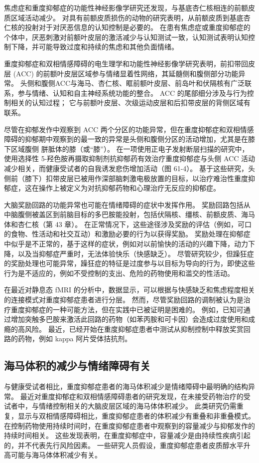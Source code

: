 焦虑症和重度抑郁症的功能性神经影像学研究还发现，与基底杏仁核相连的前额皮质区域活动减少。 对具有前额皮质损伤的动物的研究表明，从前额皮质到基底杏仁核的投射对于对厌恶信息的认知控制是必要的。 在患有焦虑症或重度抑郁症的个体中，厌恶刺激对前额叶皮层的激活减少与认知测试一致，认知测试表明认知控制下降，并可能导致过度和持续的焦虑和其他负面情绪。

重度抑郁症和双相情感障碍的电生理学和功能性神经影像学研究表明，前扣带回皮层 (ACC) 的前额叶皮层区域参与情绪显着性网络，其延髓侧和腹侧部分功能异常。 头侧和腹侧ACC与海马、杏仁核、眶前额叶皮层、前岛叶和伏隔核有广泛联系，参与情绪、认知和自主神经系统功能的整合。 ACC 的尾部细分涉及与行为控制相关的认知过程； 它与前额叶皮层、次级运动皮层和后扣带皮层的背侧区域有联系。

尽管在抑郁发作中观察到 ACC 两个分区的功能异常，但在重度抑郁症和双相情感障碍的抑郁期中观察到的最一致的异常是头侧和腹侧分区的活动增加，尤其是在膝下区域腹侧 胼胝体的膝（或“膝”）。 在一项使用正电子发射断层扫描的研究中，使用选择性 5-羟色胺再摄取抑制剂抗抑郁药有效治疗重度抑郁症与头侧 ACC 活动减少相关，而健康受试者的自我诱发悲伤增加活动（图 61-4）。 基于这些研究，头侧前（膝下）扣带皮层已被用作深部脑刺激电极放置的目标，以治疗难治性重度抑郁症，这在操作上被定义为对抗抑郁药物和心理治疗无反应的抑郁症。

大脑奖励回路的功能异常也可能在情绪障碍的症状中发挥作用。 奖励回路包括从中脑腹侧被盖区到前脑目标的多巴胺能投射，包括伏隔核、缰核、前额皮质、海马体和杏仁核（第 43 章）。 在正常情况下，这些途径涉及奖励的评估（例如，可口的食物、性活动和社交互动）和激励必要的行为以获得奖励。 奖励处理在抑郁症中似乎是不正常的，基于这样的症状，例如对以前愉快的活动的兴趣下降，动力下降，以及当抑郁症严重时，无法体验快乐（快感缺乏）。 尽管研究较少，但躁狂症的奖励处理也可能异常，躁狂症的特征是过度参与以目标为导向的行为，即使这些行为是不适应的，例如不受控制的支出、危险的药物使用和滥交的性活动。

在最近对静息态 fMRI 的分析中，数据显示，可以根据与快感缺乏和焦虑程度相关的连接模式对重度抑郁症患者进行分层。 然而，尽管奖励回路的调制被认为是治疗重度抑郁症的一种可能方法，但在实践中已被证明是困难的。 例如，已知可通过增加突触多巴胺来激活此回路的药物（如苯丙胺和可卡因）会造成过度使用和成瘾的高风险。 最近，已经开始在重度抑郁症患者中测试从抑制控制中释放奖赏回路的药物，例如 kappa 阿片受体拮抗剂。

\subsection{海马体积的减少与情绪障碍有关}
与健康受试者相比，重度抑郁症患者的海马体积减少是情绪障碍中最明确的结构异常。 最近对重度抑郁症和双相情感障碍患者的研究发现，在未接受药物治疗的受试者中，与情绪控制相关的大脑皮层区域的海马体体积减少。 此类研究仍需重复，显示与双相情感障碍相比，重度抑郁症患者的体积减少有重叠和非重叠模式。 在控制药物使用持续时间时，在重度抑郁症患者中观察到的容量减少与抑郁发作的持续时间相关。 这些发现表明，在重度抑郁症中，容量减少是由持续性疾病引起的，并不代表先行风险因素。 一些研究人员假设，重度抑郁症患者皮质醇水平升高可能与海马体体积减少有关。


